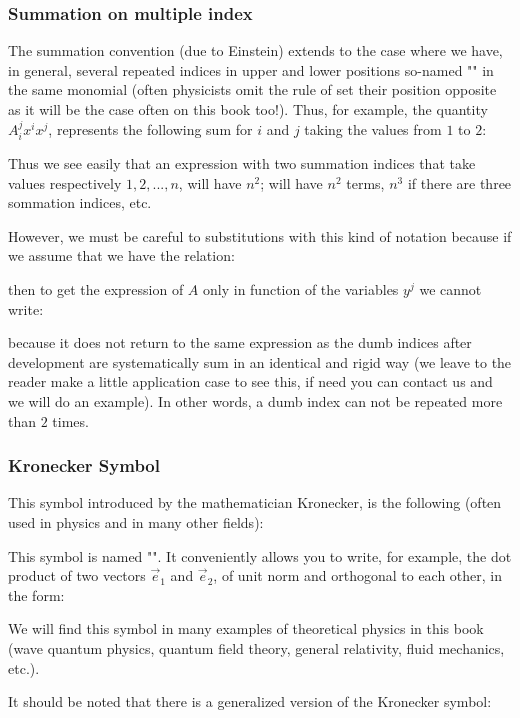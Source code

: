 	\pagebreak
	\subsubsection{Summation on multiple index}\label{einstein summation convention}
	The summation convention (due to Einstein) extends to the case where we have, in general, several repeated indices in upper and lower positions so-named "" in the same monomial (often physicists omit the rule of set their position opposite as it will be the case often on this book too!). Thus, for example, the quantity $A_i^jx^ix^j$, represents the following sum for $i$ and $j$ taking the values from $1$ to $2$:
		
	Thus we see easily that an expression with two summation indices that take values respectively $1,2,...,n$, will have $n^2$; will have $n^2$ terms, $n^3$ if there are three sommation indices, etc.
	
	However, we must be careful to substitutions with this kind of notation because if we assume that we have the relation:
	
	then to get the expression of $A$ only in function of the variables $y^j$ we cannot write:
	
	because it does not return to the same expression as the dumb indices after development are systematically sum in an identical and rigid way (we leave to the reader make a little application case to see this, if need you can contact us and we will do an example). In other words, a dumb index can not be repeated more than $2$ times.
	
	\subsubsection{Kronecker Symbol}\label{kronecker symbol}
	This symbol introduced by the mathematician Kronecker, is the following (often used in physics and in many other fields):
	
	This symbol is named "". It conveniently allows you to write, for example, the dot product of two vectors $\vec{e}_1$ and $\vec{e}_2$, of unit norm and orthogonal to each other, in the form:
	
	We will find this symbol in many examples of theoretical physics in this book (wave quantum physics, quantum field theory, general relativity, fluid mechanics, etc.).
	
	It should be noted that there is a generalized version of the Kronecker symbol:
	
